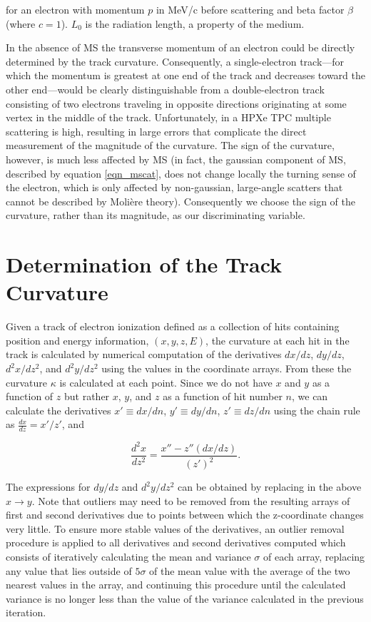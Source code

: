 \documentclass{JINST}
\begin{document}
\noindent for an electron with momentum $p$ in MeV/c before scattering and beta factor $\beta$ (where $c = 1$).  $L_{0}$ is the radiation length, a property of the medium. 

In the absence of MS the transverse momentum of an electron could be directly determined by the track
curvature. Consequently, a single-electron track---for which the momentum is greatest at one end of the
track and decreases toward the other end---would be clearly distinguishable
from a double-electron track consisting of two electrons traveling in opposite directions originating at some vertex in the middle of the track.  Unfortunately, in a HPXe TPC multiple scattering is high, resulting in large errors that complicate the direct measurement of the magnitude of the curvature. The sign of the curvature, however, is much less affected by MS (in fact, the gaussian component of MS, described by equation \ref{eqn_mscat}, does not change locally the turning sense of the electron, which is only affected by non-gaussian, large-angle scatters that cannot be described by Moli\`{e}re theory). Consequently we choose the sign of the curvature, rather than its magnitude, as our discriminating variable.  

\section{Determination of the Track Curvature}\label{sec.curvature}
Given a track of electron ionization defined as a collection of hits containing position and energy information, $(x,y,z,E)$, the curvature at each hit in the track is calculated by numerical computation of the derivatives $dx/dz$, $dy/dz$, $d^2x/dz^2$, and $d^2y/dz^2$ using the values in the coordinate arrays.  From these the curvature $\kappa$ is calculated at each point.  Since we do not have $x$ and $y$ as a function of $z$ but rather $x$, $y$, and $z$ as a function of hit number $n$, we can calculate the derivatives $x' \equiv dx/dn$, $y' \equiv dy/dn$, $z' \equiv dz/dn$ using the chain rule as $\frac{dx}{dz} = x'/z'$, and

\begin{equation}
\frac{d^2x}{dz^2} = \frac{x'' - z''(dx/dz)}{(z')^2}.
\end{equation}

The expressions for $dy/dz$ and $d^2y/dz^2$ can be obtained by replacing in the above $x \rightarrow y$.  Note that outliers may need to be removed from the resulting arrays of first and second derivatives due to points between which the z-coordinate changes very little.  To ensure more stable values of the derivatives, an outlier removal procedure is applied to all derivatives and second derivatives computed which consists of iteratively calculating the mean and variance $\sigma$ of each array, replacing any value that lies outside of $5\sigma$ of the mean value with the average of the two nearest values in the array, and continuing this procedure until the calculated variance is no longer less than the value of the variance calculated in the previous iteration. %
\end{document}
